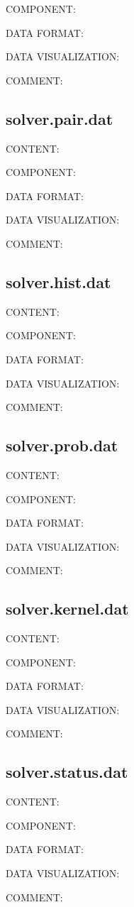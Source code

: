 {\color{green}COMPONENT:}

{\color{blue}DATA FORMAT:}

{\color{brown}DATA VISUALIZATION:}

{\color{purple}COMMENT:}

\subsection{solver.pair.dat}
{\color{red}CONTENT:}

{\color{green}COMPONENT:}

{\color{blue}DATA FORMAT:}

{\color{brown}DATA VISUALIZATION:}

{\color{purple}COMMENT:}

\subsection{solver.hist.dat}
{\color{red}CONTENT:}

{\color{green}COMPONENT:}

{\color{blue}DATA FORMAT:}

{\color{brown}DATA VISUALIZATION:}

{\color{purple}COMMENT:}

\subsection{solver.prob.dat}
{\color{red}CONTENT:}

{\color{green}COMPONENT:}

{\color{blue}DATA FORMAT:}

{\color{brown}DATA VISUALIZATION:}

{\color{purple}COMMENT:}

\subsection{solver.kernel.dat}
{\color{red}CONTENT:}

{\color{green}COMPONENT:}

{\color{blue}DATA FORMAT:}

{\color{brown}DATA VISUALIZATION:}

{\color{purple}COMMENT:}

\subsection{solver.status.dat}
{\color{red}CONTENT:}

{\color{green}COMPONENT:}

{\color{blue}DATA FORMAT:}

{\color{brown}DATA VISUALIZATION:}

{\color{purple}COMMENT:}
